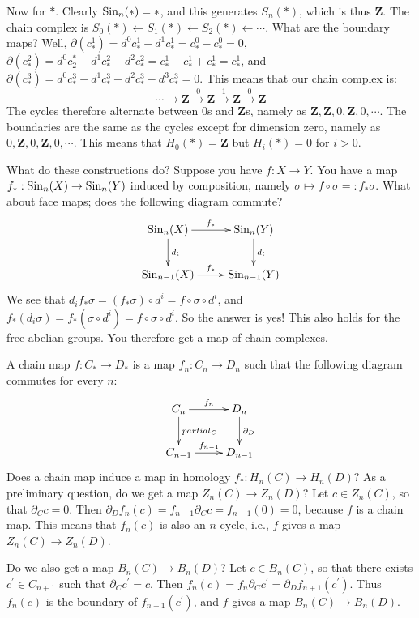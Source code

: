 Now for $\ast$. Clearly $\mathrm{Sin}_n(\ast)=\ast$, and this generates $S_n(\ast)$, which is thus $\mathbf{Z}$. The chain complex is $S_0(\ast)\leftarrow S_1(\ast)\leftarrow S_2(\ast)\leftarrow\cdots$. What are the boundary maps? Well, $\partial(c^1_\ast)=d^0c^1_\ast - d^1c^1_\ast = c^0_\ast - c^0_\ast = 0$, $\partial(c^2_\ast)=d^0c_2^\ast - d^1 c^2_\ast + d^2 c^2_\ast = c^1_\ast - c^1_\ast + c^1_\ast = c^1_\ast$, and $\partial (c^3_\ast)=d^0 c^3_\ast - d^1 c^3_\ast + d^2 c^3_\ast - d^3 c^3_\ast = 0$. This means that our chain complex is:
$$\cdots\to\mathbf{Z}\xrightarrow{0}\mathbf{Z}\xrightarrow{1}\mathbf{Z}\xrightarrow{0}\mathbf{Z}$$
The cycles therefore alternate between $0$s and $\mathbf{Z}$s, namely as $\mathbf{Z},\mathbf{Z},0,\mathbf{Z},0,\cdots$. The boundaries are the same as the cycles except for dimension zero, namely as $0,\mathbf{Z},0,\mathbf{Z},0,\cdots$. This means that $ H_0(\ast)=\mathbf{Z}$ but $ H_i(\ast)=0$ for $i>0$.

What do these constructions do? Suppose you have $f:X\to Y$. You have a map $f_\ast:\mathrm{Sin}_n(X)\to\mathrm{Sin}_n(Y)$ induced by composition, namely $\sigma\mapsto f\circ \sigma=:f_\ast\sigma$. What about face maps; does the following diagram commute?
\begin{eqnarray*}
\xymatrix{\Sin_n(X)\ar[r]^{f_\ast}\ar[d]^{d_i} & \Sin_n(Y)\ar[d]^{d_i}\\
\Sin_{n-1}(X)\ar[r]^{f_\ast} & \Sin_{n-1}(Y)}
\end{eqnarray*}
We see that $d_if_\ast\sigma=(f_\ast\sigma)\circ d^i=f\circ\sigma\circ d^i$, and $f_\ast(d_i\sigma)=f_\ast(\sigma\circ d^i)=f\circ\sigma\circ d^i$. So the answer is yes! This also holds for the free abelian groups. You therefore get a map of chain complexes.

A chain map $f:C_\ast\to D_\ast$ is a map $f_n:C_n\to D_n$ such that the following diagram commutes for every $n$:
\begin{equation*}
    \xymatrix{
	C_n\ar[r]^{f_n}\ar[d]^{partial_C} & D_n\ar[d]^{\partial_D}\\
	C_{n-1}\ar[r]^{f_{n-1}} & D_{n-1}
    }
\end{equation*}
Does a chain map induce a map in homology $f_\ast: H_n(C)\to H_n(D)$? As a preliminary question, do we get a map $Z_n(C)\to Z_n(D)$? Let $c\in Z_n(C)$, so that $\partial_C c = 0$. Then $\partial_D f_n(c) = f_{n-1}\partial_C c = f_{n-1}(0) = 0$, because $f$ is a chain map. This means that $f_n(c)$ is also an $n$-cycle, i.e., $f$ gives a map $Z_n(C)\to Z_n(D)$.

Do we also get a map $B_n(C)\to B_n(D)$? Let $c\in B_n(C)$, so that there exists $c^\prime \in C_{n+1}$ such that $\partial_C c^\prime = c$. Then $f_n(c) = f_n\partial_C c^\prime = \partial_D f_{n+1}(c^\prime)$. Thus $f_n(c)$ is the boundary of $f_{n+1}(c^\prime)$, and $f$ gives a map $B_n(C)\to B_n(D)$.

